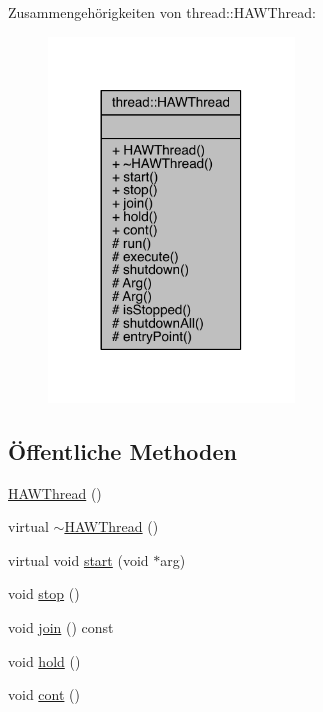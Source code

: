 Zusammengehörigkeiten von thread\+:\+:H\+A\+W\+Thread\+:\nopagebreak
\begin{figure}[H]
\begin{center}
\leavevmode
\includegraphics[width=185pt]{classthread_1_1_h_a_w_thread__coll__graph}
\end{center}
\end{figure}
\subsection*{Öffentliche Methoden}
\begin{DoxyCompactItemize}
\item 
\hyperlink{classthread_1_1_h_a_w_thread_a7ae3280c8aee6ae6536c736a20d92e8d}{H\+A\+W\+Thread} ()
\item 
virtual \hyperlink{classthread_1_1_h_a_w_thread_a84706dda23aa384a43ced901381e795b}{$\sim$\+H\+A\+W\+Thread} ()
\item 
virtual void \hyperlink{classthread_1_1_h_a_w_thread_ae08d268c337511a1e67fbbeefcb1e89d}{start} (void $\ast$arg)
\item 
void \hyperlink{classthread_1_1_h_a_w_thread_ae8a89c83fd7e9b9a712c19f636ab2638}{stop} ()
\item 
void \hyperlink{classthread_1_1_h_a_w_thread_adbc0234a7b8eb2271a5cb4a7b8090956}{join} () const
\item 
void \hyperlink{classthread_1_1_h_a_w_thread_a18f2a0cc61833e98b18e56ea541fa38b}{hold} ()
\item 
void \hyperlink{classthread_1_1_h_a_w_thread_a4c480261e3236c90c8de73be55650ba4}{cont} ()
\end{DoxyCompactItemize}
